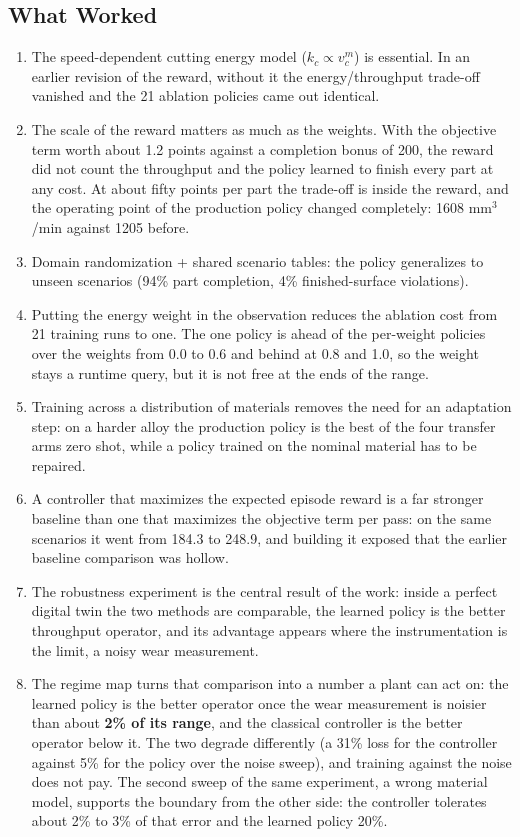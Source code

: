 \documentclass[11pt,a4paper]{article}
\newcommand{\alert}[1]{\textcolor{IITGold}{\textbf{#1}}}
\begin{document}
\subsection{What Worked}
\begin{enumerate}
    \item The speed-dependent cutting energy model ($k_c \propto v_c^m$) is essential. In an earlier revision of the reward, without it the energy/throughput trade-off vanished and the 21 ablation policies came out identical.
    \item The scale of the reward matters as much as the weights. With the objective term worth about 1.2 points against a completion bonus of 200, the reward did not count the throughput and the policy learned to finish every part at any cost. At about fifty points per part the trade-off is inside the reward, and the operating point of the production policy changed completely: 1608 mm$^3$/min against 1205 before.
    \item Domain randomization + shared scenario tables: the policy generalizes to unseen scenarios (94\% part completion, 4\% finished-surface violations).
    \item Putting the energy weight in the observation reduces the ablation cost from 21 training runs to one. The one policy is ahead of the per-weight policies over the weights from 0.0 to 0.6 and behind at 0.8 and 1.0, so the weight stays a runtime query, but it is not free at the ends of the range.
    \item Training across a distribution of materials removes the need for an adaptation step: on a harder alloy the production policy is the best of the four transfer arms zero shot, while a policy trained on the nominal material has to be repaired.
    \item A controller that maximizes the expected episode reward is a far stronger baseline than one that maximizes the objective term per pass: on the same scenarios it went from 184.3 to 248.9, and building it exposed that the earlier baseline comparison was hollow.
    \item The robustness experiment is the central result of the work: inside a perfect digital twin the two methods are comparable, the learned policy is the better throughput operator, and its advantage appears where the instrumentation is the limit, a noisy wear measurement.
    \item The regime map turns that comparison into a number a plant can act on: the learned policy is the better operator once the wear measurement is noisier than about \alert{2\% of its range}, and the classical controller is the better operator below it. The two degrade differently (a 31\% loss for the controller against 5\% for the policy over the noise sweep), and training against the noise does not pay. The second sweep of the same experiment, a wrong material model, supports the boundary from the other side: the controller tolerates about 2\% to 3\% of that error and the learned policy 20\%.

\end{enumerate}
\end{document}
